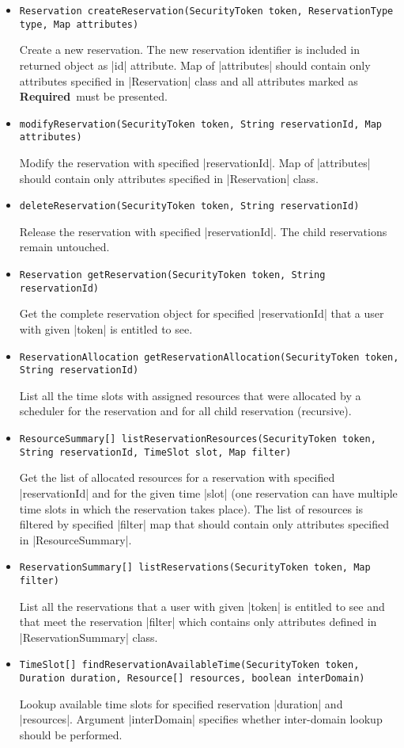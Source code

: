 \documentclass[a4paper]{report}
\newenvironment{Api}{\begin{itemize}}{\end{itemize}}
\newcommand{\ApiCode}[1]{\lstinline[style=styleApi]|#1|}
\newcommand{\ApiItem}[1]{\item #1 %

}
\newcommand{\ApiCmd}[1]{\ApiItem{\ApiCode{#1}}}
\newcommand{\ApiRequired}{{\color{blue!50!black}\textbf{Required}}}
\begin{document}
\begin{Api}

\ApiCmd{Reservation createReservation(SecurityToken token, ReservationType type, Map attributes)}
Create a new reservation. The new reservation identifier is included in returned object as |id| attribute. Map of |attributes| should contain only attributes specified in |Reservation| class and all attributes marked as \ApiRequired\ must be presented.

\ApiCmd{modifyReservation(SecurityToken token, String reservationId, Map attributes)}
Modify the reservation with specified |reservationId|. Map of |attributes| should contain only attributes specified in |Reservation| class.

\ApiCmd{deleteReservation(SecurityToken token, String reservationId)}
Release the reservation with specified |reservationId|. The child reservations remain untouched.

\ApiCmd{Reservation getReservation(SecurityToken token, String reservationId)}
Get the complete reservation object for specified |reservationId| that a user with given |token| is entitled to see.

\ApiCmd{ReservationAllocation getReservationAllocation(SecurityToken token, String reservationId)}
List all the time slots with assigned resources that were allocated by a scheduler for the reservation and for all child reservation (recursive).

\ApiCmd{ResourceSummary[] listReservationResources(SecurityToken token, String reservationId, TimeSlot slot, Map filter)}
Get the list of allocated resources for a reservation with specified |reservationId| and for the given time |slot| (one reservation can have multiple time slots in which the reservation takes place). The list of resources is filtered by specified |filter| map that should contain only attributes specified in |ResourceSummary|.

\ApiCmd{ReservationSummary[] listReservations(SecurityToken token, Map filter)}
List all the reservations that a user with given |token| is entitled to see and that meet the reservation |filter| which contains only attributes defined in |ReservationSummary| class.

\ApiCmd{TimeSlot[] findReservationAvailableTime(SecurityToken token, Duration duration, Resource[] resources, boolean interDomain)}
Lookup available time slots for specified reservation |duration| and |resources|. Argument |interDomain| specifies whether inter-domain lookup should be performed.

\end{Api}
\end{document}
